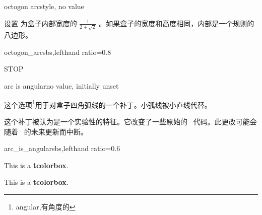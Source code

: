   \begin{docTcbKey}[][doc new=2015-05-05]{octogon arc}{}{style, no value}
  
  设置  为盒子内部宽度的 $\frac{1}{2+\sqrt{2}}$ 。如果盒子的宽度和高度相同，内部是一个规则的八边形。
  \begin{exdispExample*}{octogon_arc}{sbs,lefthand ratio=0.8}
  \begin{tcolorbox}[enhanced,
  size=minimal,auto outer arc,
  width=2.1cm,octogon arc,
  colback=red,colframe=white,colupper=white,
  fontupper=\fontsize{7mm}{7mm}\selectfont\bfseries\sffamily,
  halign=center,valign=center,
  square,arc is angular,
  borderline={0.2mm}{-1mm}{red}  ]
  STOP
  \end{tcolorbox}
  \end{exdispExample*}
  \end{docTcbKey}

  

\begin{docTcbKey}[][doc new=2015-05-05]{arc is angular}{}{no value, initially unset}
  
  这个选项\footnote{angular,有角度的}用于对盒子四角弧线的一个补丁。小弧线被小直线代替。
  \begin{marker}
  
  这个补丁被认为是一个实验性的特征。它改变了一些原始的 \tikzname\ 代码。此更改可能会随着 \tikzname\ 的未来更新而中断。
  \end{marker}
  
  \begin{exdispExample*}{arc_is_angular}{sbs,lefthand ratio=0.6}
  
  \begin{tcolorbox}
  This is a \textbf{tcolorbox}.
  \end{tcolorbox}
  \begin{tcolorbox}
  This is a \textbf{tcolorbox}.
  \end{tcolorbox}
  \end{exdispExample*}
  
  \end{docTcbKey}
  
